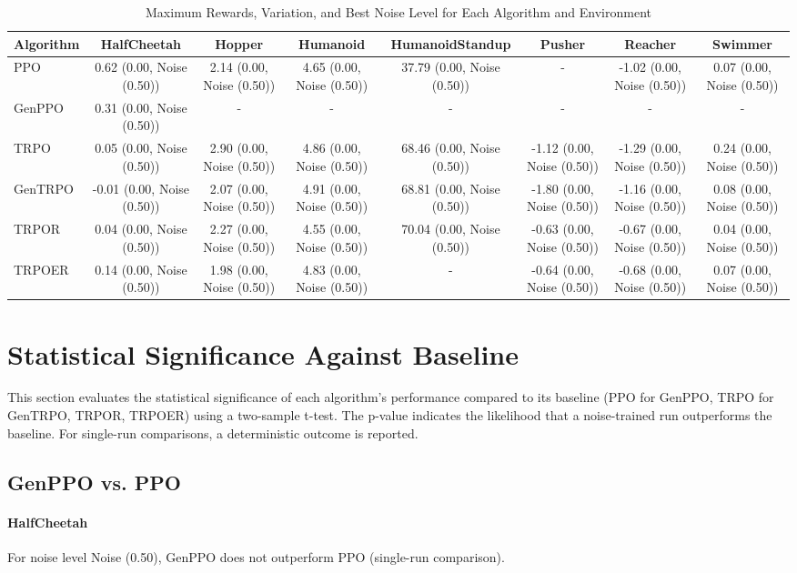 \begin{table}[h]
\centering
\caption{Maximum Rewards, Variation, and Best Noise Level for Each Algorithm and Environment}
\label{tab:numerical_results}
\begin{tabular}{|l|c|c|c|c|c|c|c|}
\hline
Algorithm & HalfCheetah & Hopper & Humanoid & HumanoidStandup & Pusher & Reacher & Swimmer \\ \hline
PPO & 0.62 (0.00, Noise (0.50)) & 2.14 (0.00, Noise (0.50)) & 4.65 (0.00, Noise (0.50)) & 37.79 (0.00, Noise (0.50)) & - & -1.02 (0.00, Noise (0.50)) & 0.07 (0.00, Noise (0.50)) \\ \hline
GenPPO & 0.31 (0.00, Noise (0.50)) & - & - & - & - & - & - \\ \hline
TRPO & 0.05 (0.00, Noise (0.50)) & 2.90 (0.00, Noise (0.50)) & 4.86 (0.00, Noise (0.50)) & 68.46 (0.00, Noise (0.50)) & -1.12 (0.00, Noise (0.50)) & -1.29 (0.00, Noise (0.50)) & 0.24 (0.00, Noise (0.50)) \\ \hline
GenTRPO & -0.01 (0.00, Noise (0.50)) & 2.07 (0.00, Noise (0.50)) & 4.91 (0.00, Noise (0.50)) & 68.81 (0.00, Noise (0.50)) & -1.80 (0.00, Noise (0.50)) & -1.16 (0.00, Noise (0.50)) & 0.08 (0.00, Noise (0.50)) \\ \hline
TRPOR & 0.04 (0.00, Noise (0.50)) & 2.27 (0.00, Noise (0.50)) & 4.55 (0.00, Noise (0.50)) & 70.04 (0.00, Noise (0.50)) & -0.63 (0.00, Noise (0.50)) & -0.67 (0.00, Noise (0.50)) & 0.04 (0.00, Noise (0.50)) \\ \hline
TRPOER & 0.14 (0.00, Noise (0.50)) & 1.98 (0.00, Noise (0.50)) & 4.83 (0.00, Noise (0.50)) & - & -0.64 (0.00, Noise (0.50)) & -0.68 (0.00, Noise (0.50)) & 0.07 (0.00, Noise (0.50)) \\ \hline
\end{tabular}
\end{table}
\section{Statistical Significance Against Baseline}
This section evaluates the statistical significance of each algorithm’s performance compared to its baseline (PPO for GenPPO, TRPO for GenTRPO, TRPOR, TRPOER) using a two-sample t-test. The p-value indicates the likelihood that a noise-trained run outperforms the baseline. For single-run comparisons, a deterministic outcome is reported.
\subsection{GenPPO vs. PPO}
\paragraph{HalfCheetah}
For noise level Noise (0.50), GenPPO does not outperform PPO (single-run comparison).
